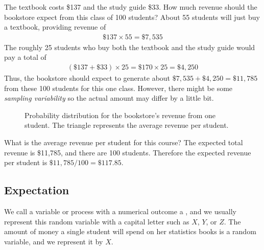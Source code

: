 \begin{examplewrap}
\begin{nexample}{The textbook costs \$137 and the study guide \$33. How much revenue should the bookstore expect from this class of 100 students?}\label{bookStoreRev}
About 55 students will just buy a textbook, providing revenue of
\begin{align*}
\$137 \times  55 = \$7,535
\end{align*}
The roughly 25 students who buy both the textbook and the study guide would pay a total of
\begin{align*}
(\$137 + \$33) \times  25 = \$170 \times  25 = \$4,250
\end{align*}
Thus, the bookstore should expect to generate about $\$7,535 + \$4,250 = \$11,785$ from these 100 students for this one class. However, there might be some \emph{sampling variability} so the actual amount may differ by a little bit.
\end{nexample}
\end{examplewrap}

\begin{figure}[h]
  \centering
  \caption{Probability distribution for the bookstore's
      revenue from one student.
      The triangle represents
      the average revenue per student.}
  \label{bookCostDist}
\end{figure}

\D{\newpage}

\begin{examplewrap}
\begin{nexample}{What is the average revenue per student for this course?}\label{revFromStudent}
The expected total revenue is \$11,785, and there are 100 students. Therefore the expected revenue per student is $\$11,785/100 =  \$117.85$.
\end{nexample}
\end{examplewrap}

\subsection{Expectation}


We call a variable or process with a numerical outcome a , and we usually represent this random variable with a capital letter such as $X$, $Y$, or $Z$. The amount of money a single student will spend on her statistics books is a random variable, and we represent it by $X$.


